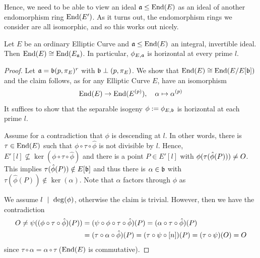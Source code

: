 Hence, we need to be able to view an ideal $\mathfrak{a} \leq \mathrm{End}(E)$ as an ideal of another endomorphism ring $\mathrm{End}(E')$.
As it turns out, the endomorphism rings we consider are all isomorphic, and so this works out nicely. 
\begin{lemma}
    Let $E$ be an ordinary Elliptic Curve and $\mathfrak{a} \leq \mathrm{End}(E)$ an integral, invertible ideal.
    Then $\mathrm{End}(E) \cong \mathrm{End}(E_{\mathfrak{a}})$.
    In particular, $\phi_{E, \mathfrak{a}}$ is horizontal at every prime $l$.
\end{lemma}
\begin{proof}
    Let $\mathfrak{a} = \mathfrak{b}(p, \pi_E)^r$ with $\mathfrak{b} \perp (p, \pi_E)$.
    We show that $\mathrm{End}(E) \cong \mathrm{End}(E/E[\mathfrak{b}])$ and the claim follows, as for any Elliptic Curve $E$, have an isomorphism
    \begin{equation*}
        \mathrm{End}(E) \to \mathrm{End}(E^{(p)}), \quad \alpha \mapsto \alpha^{(p)}
    \end{equation*}
    It suffices to show that the separable isogeny $\phi := \phi_{E, \mathfrak{b}}$ is horizontal at each prime $l$.

    Assume for a contradiction that $\phi$ is descending at $l$.
    In other words, there is $\tau \in \mathrm{End}(E)$ such that $\phi \circ \tau \circ \hat{\phi}$ is not divisible by $l$.
    Hence, $E'[l] \not\subseteq \ker(\phi \circ \tau \circ \hat{\phi})$ and there is a point $P \in E'[l]$ with $\phi(\tau(\hat{\phi}(P))) \neq O$.
    This implies $\tau(\hat{\phi}(P)) \notin E[\mathfrak{b}]$ and thus there is $\alpha \in \mathfrak{b}$ with $\tau(\hat{\phi}(P)) \notin \ker(\alpha)$.
    Note that $\alpha$ factors through $\phi$ as
    \begin{center}
    \end{center}
    We assume $l \ \mid \  \deg(\phi)$, otherwise the claim is trivial.
    However, then we have the contradiction
    \begin{align*}
        O \neq \psi((\phi \circ \tau \circ \hat{\phi})(P)) &= (\psi \circ \phi \circ \tau \circ \hat{\phi})(P) = (\alpha \circ \tau \circ \hat{\phi})(P) \\
        &= (\tau \circ \alpha \circ \hat{\phi})(P) = (\tau \circ \psi \circ [n])(P) = (\tau \circ \psi)(O) = O
    \end{align*}
    since $\tau \circ \alpha = \alpha \circ \tau$ ($\mathrm{End}(E)$ is commutative).
\end{proof}
